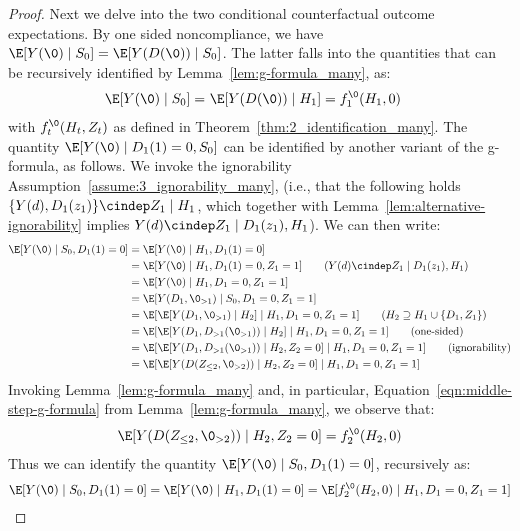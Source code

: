 \begin{proof}
Next we delve into the two conditional counterfactual outcome expectations. 
By one sided noncompliance, we have $\E[Y(\0)\mid S_0] = \E[Y(D(\0))\mid S_0]$. The latter falls into the quantities that can be recursively identified by Lemma~\ref{lem:g-formula_many}, as:
\begin{equation}
\begin{aligned}
    \E[Y(\0)\mid S_0] =~& \E[Y(D(\0))\mid H_1] = f_1^{\0}(H_1, 0)
\end{aligned}
\end{equation}
with $f_t^{\0}(H_t, Z_t)$ as defined in Theorem~\ref{thm:2_identification_many}.
The quantity $\E[Y(\0)\mid D_1(1)=0, S_0]$ can be identified by another variant of the g-formula, as follows. We invoke the ignorability Assumption~\ref{assume:3_ignorability_many}, (i.e., that the following holds $\{Y(d), D_1(z_1)\} \cindep Z_1 \mid H_1$, which together with Lemma~\ref{lem:alternative-ignorability} implies $Y(d) \cindep Z_1 \mid D_1(z_1), H_1$). We can then write:
\begin{align*}
\E[ Y(\0) \mid S_0, D_1(1)=0 ] &= \E[ Y(\0) \mid H_1, D_1(1)=0 ]\\
&=
  \E[ Y(\0) \mid H_1, D_1(1)=0, Z_1=1 ]  \tag{$Y(d) \cindep Z_1 \mid D_1(z_1), H_1$}\\
&=
  \E[ Y(\0) \mid H_1, D_1=0, Z_1=1 ]     \\
&=
  \E[ Y(D_1, \0_{>1}) \mid S_0, D_1=0, Z_1=1 ]    \\
&=
  \E[ \E[ Y(D_1, \0_{>1}) \mid H_2] \mid H_1, D_1=0, Z_1=1 ]         \tag{$H_2\supseteq H_1\cup \{D_1, Z_1\}$}\\
&=
  \E[ \E[ Y(D_1, D_{>1}(\0_{>1})) \mid H_2] \mid H_1, D_1=0, Z_1=1 ]        \tag{one-sided}\\
&=
  \E[ \E[ Y(D_1, D_{>1}(\0_{>1})) \mid H_2, Z_2=0] \mid H_1, D_1=0, Z_1=1 ]        \tag{ignorability}\\
&=
  \E[ \E[ Y(D(Z_{\leq 2}, \0_{>2})) \mid H_2, Z_2=0] \mid H_1, D_1=0, Z_1=1 ] 
\end{align*}
Invoking Lemma~\ref{lem:g-formula_many} and, in particular, Equation~\eqref{eqn:middle-step-g-formula} from Lemma~\ref{lem:g-formula_many}, we observe that:
\begin{align*}
    \E[ Y(D(Z_{\leq 2}, \0_{>2})) \mid H_2, Z_2=0] = f_2^{\0}(H_2, 0)
\end{align*}
Thus we can identify the quantity $\E[Y(\0)\mid S_0, D_1(1)=0]$, recursively as:
\begin{align}
    \E[Y(\0)\mid S_0, D_1(1)=0] = \E[Y(\0)\mid H_1, D_1(1)=0] = \E[f_2^{\0}(H_2, 0)\mid H_1, D_1=0, Z_1=1]
\end{align}


\end{proof}
